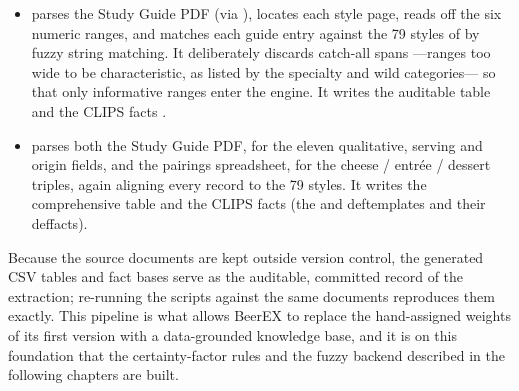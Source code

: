 \begin{itemize}[leftmargin=2em]
  \item {} parses the Study Guide PDF (via
        ), locates each style page, reads off the six numeric
        ranges, and matches each guide entry against the 79 styles of
         by fuzzy string matching. It deliberately discards
        catch-all spans ---ranges too wide to be characteristic, as listed by the
        specialty and wild categories--- so that only informative ranges enter
        the engine. It writes the auditable table 
        and the CLIPS facts .
  \item {} parses both the Study Guide PDF, for the
        eleven qualitative, serving and origin fields, and the pairings
        spreadsheet, for the cheese / entrée / dessert triples, again aligning
        every record to the 79 styles. It writes the comprehensive table
         and the CLIPS facts 
        (the  and  deftemplates and their
        deffacts).
\end{itemize}

Because the source documents are kept outside version control, the generated CSV
tables and  fact bases serve as the auditable, committed record of the
extraction; re-running the scripts against the same documents reproduces them
exactly. This pipeline is what allows BeerEX to replace the hand-assigned weights
of its first version with a data-grounded knowledge base, and it is on this
foundation that the certainty-factor rules and the fuzzy backend described in the
following chapters are built.
